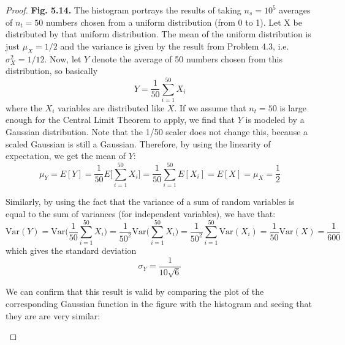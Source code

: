 \begin{proof}
    \vspace{1em}

    \textbf{Fig. 5.14.} The histogram portrays the results of taking $n_s = 10^5$ averages
    of $n_t = 50$ numbers chosen from a uniform distribution (from 0 to 1). Let X be
    distributed by that uniform distribution. The mean of the uniform distribution 
    is just $\mu_X = 1/2$ and the variance is given by the result from Problem 4.3, i.e.
    $\sigma_X^2 = 1/12$. Now, let $Y$ denote the average of 50 numbers chosen from this
    distribution, so basically
    \[
        Y = \frac{1}{50} \sum_{i = 1}^{50} X_i
    \] 
    where the $X_i$ variables are distributed like $X$.
    If we assume that $n_t = 50$ is large enough for the Central Limit Theorem to apply,
    we find that $Y$ is modeled by a Gaussian distribution. Note that the 1/50 scaler
    does not change this, because a scaled Gaussian is still a Gaussian. Therefore, by
    using the linearity of expectation, we get the mean of $Y$:
    \[
        \mu_Y = E[Y] = \frac{1}{50}E\bigg[\sum_{i = 1}^{50} X_i\bigg] 
        = \frac{1}{50}\sum_{i = 1}^{50} E[X_i] 
        = E[X] = \mu_X = \frac{1}{2}
    \] 

    Similarly, by using the fact that the variance of a sum of random variables is equal
    to the sum of variances (for independent variables), we have that:
    \[
        \text{Var}(Y) = \text{Var}\bigg(\frac{1}{50} \sum_{i = 1}^{50} X_i\bigg)
        = \frac{1}{50^2} \text{Var}\bigg(\sum_{i = 1}^{50} X_i\bigg)
        = \frac{1}{50^2} \sum_{i = 1}^{50} \text{Var}(X_i)
        = \frac{1}{50} \text{Var}(X) = \frac{1}{600}
    \] 
    which gives the standard deviation
    \[
        \sigma_Y = \frac{1}{10\sqrt{6}}
    \] 

    We can confirm that this result is valid by comparing the plot of the corresponding Gaussian 
    function in the figure with the histogram and seeing that they are are very similar: 
    \begin{figure}[H]%
        \centering
        \qquad
    \end{figure}
\end{proof}
